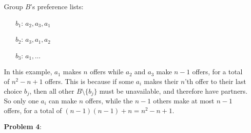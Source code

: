 \documentclass{article}
\begin{document}
\begin{enumerate}[a)]
    Group $B$'s preference lists: 
    \begin{enumerate}
        \item[$b_1$:] $a_2, a_3, a_1$
        \item[$b_2$:] $a_3, a_1, a_2 $
        \item[$b_3$:] $a_1, \dots$
    \end{enumerate}
    In this example, $a_1$ makes $n$ offers while $a_2$ and $a_3$ make $n - 1$ offers, for a total of $n^2 - n + 1$ offers. This is because if some $a_i$ makes their $n$'th offer to their last choice $b_j$, then all other $B \setminus \{b_j\}$ must be unavailable, and therefore have partners. So only one $a_i$ can make $n$ offers, while the $n - 1$ others make at most $n - 1$ offers, for a total of $(n - 1)(n - 1) + n = n^2 - n + 1$. 
\end{enumerate}
\textbf{Problem 4}:
\end{document}
